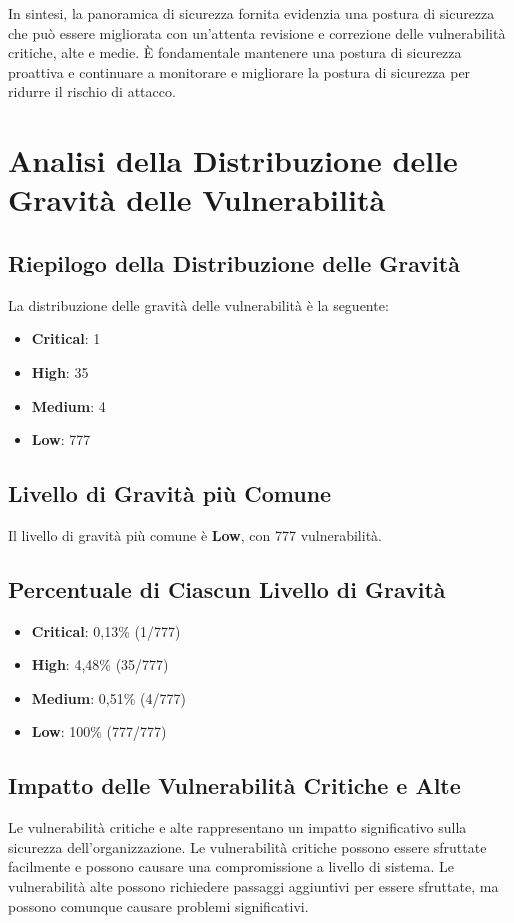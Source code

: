 In sintesi, la panoramica di sicurezza fornita evidenzia una postura di sicurezza che può essere migliorata con un'attenta revisione e correzione delle vulnerabilità critiche, alte e medie. È fondamentale mantenere una postura di sicurezza proattiva e continuare a monitorare e migliorare la postura di sicurezza per ridurre il rischio di attacco.

\chapter{Analisi della Distribuzione delle Gravità delle Vulnerabilità}

\section{Riepilogo della Distribuzione delle Gravità}

La distribuzione delle gravità delle vulnerabilità è la seguente:
\begin{itemize}
\item \textbf{Critical}: 1
\item \textbf{High}: 35
\item \textbf{Medium}: 4
\item \textbf{Low}: 777
\end{itemize}
\section{Livello di Gravità più Comune}

Il livello di gravità più comune è \textbf{Low}, con 777 vulnerabilità.

\section{Percentuale di Ciascun Livello di Gravità}
\begin{itemize}
\item \textbf{Critical}: 0,13\% (1/777)
\item \textbf{High}: 4,48\% (35/777)
\item \textbf{Medium}: 0,51\% (4/777)
\item \textbf{Low}: 100\% (777/777)
\end{itemize}
\section{Impatto delle Vulnerabilità Critiche e Alte}

Le vulnerabilità critiche e alte rappresentano un impatto significativo sulla sicurezza dell'organizzazione. Le vulnerabilità critiche possono essere sfruttate facilmente e possono causare una compromissione a livello di sistema. Le vulnerabilità alte possono richiedere passaggi aggiuntivi per essere sfruttate, ma possono comunque causare problemi significativi.

